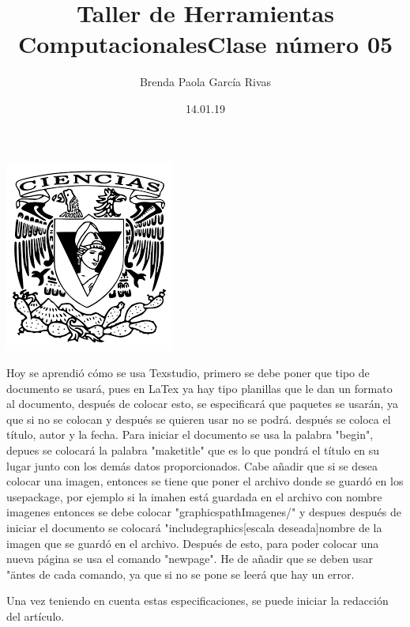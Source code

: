 \documentclass[letterpaper, 12pt,oneside]{article}
\title{\huge\color{orange}Taller de Herramientas Computacionales}
\author{Brenda Paola García Rivas}
\date{14.01.19}
\begin{document}
	\maketitle
	\begin{center}
		\includegraphics[scale=0.98]{1.png}
	\end{center}
	\newpage
	\title{\huge Clase número 05\\}
	
	Hoy se aprendió cómo se usa Texstudio, primero se debe poner que tipo de documento se usará, pues en LaTex ya hay tipo planillas que le dan un formato al documento, después de colocar esto, se especificará que paquetes se usarán, ya que si no se colocan y después se quieren usar no se podrá.
	después se coloca el título, autor y la fecha. Para iniciar el documento se usa la palabra "begin", depues se colocará la palabra "maketitle" que es lo que pondrá el título en su lugar junto con los demás datos proporcionados. Cabe añadir que si se desea colocar una imagen, entonces se tiene que poner el archivo donde se guardó en los usepackage, por ejemplo si la imahen está guardada en el archivo con nombre imagenes entonces se debe colocar "graphicspath{{Imagenes/}}" y despues después de iniciar el documento se colocará "includegraphics[escala deseada]{nombre de la imagen que se guardó en el archivo}. Después de esto, para poder colocar una nueva página se usa el comando "newpage". He de añadir que se deben usar "\" antes de cada comando, ya que si no se pone se leerá que hay un error. 
	
	Una vez teniendo en cuenta estas especificaciones, se puede iniciar la redacción del artículo. 
\end{document}
